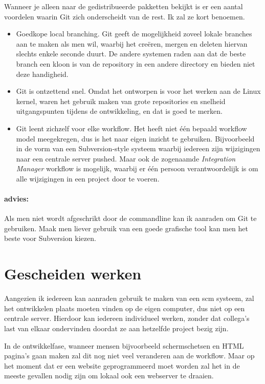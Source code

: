 Wanneer je alleen naar de gedistribueerde pakketten bekijkt is er een aantal voordelen waarin Git zich onderscheidt van de rest. Ik zal ze kort benoemen.

\begin{itemize}
  \item Goedkope local branching. Git geeft de mogelijkheid zoveel lokale branches aan te maken als men wil, waarbij het creëren, mergen en deleten hiervan slechts enkele seconde duurt. De andere systemen raden aan dat de beste branch een kloon is van de repository in een andere directory en bieden niet deze handigheid.
  \item Git is ontzettend snel\cite{whygitisbetterthanx}. Omdat het ontworpen is voor het werken aan de Linux kernel, waren het gebruik maken van grote repositories en snelheid uitgangspunten tijdens de ontwikkeling, en dat is goed te merken.
  \item Git leent zichzelf voor elke workflow. Het heeft niet één bepaald workflow model meegekregen, dus is het naar eigen inzicht te gebruiken. Bijvoorbeeld in de vorm van een Subversion-style systeem waarbij iedereen zijn wijzigingen naar een centrale server pushed. Maar ook de zogenaamde \emph{Integration Manager} workflow is mogelijk, waarbij er één persoon verantwoordelijk is om alle wijzigingen in een project door te voeren.
\end{itemize}

\paragraph{advies:} Als men niet wordt afgeschrikt door de commandline kan ik aanraden om Git te gebruiken. Maak men liever gebruik van een goede grafische tool kan men het beste voor Subversion kiezen.

\section{Gescheiden werken}

Aangezien ik iedereen kan aanraden gebruik te maken van een {\sc scm} systeem, zal het ontwikkelen plaats moeten vinden op de eigen computer, dus niet op een centrale server. Hierdoor kan iedereen individueel werken, zonder dat collega's last van elkaar ondervinden doordat ze aan hetzelfde project bezig zijn.

In de ontwikkelfase, wanneer mensen bijvoorbeeld schermschetsen en HTML pagina's gaan maken zal dit nog niet veel veranderen aan de workflow. Maar op het moment dat er een website geprogrammeerd moet worden zal het in de meeste gevallen nodig zijn om lokaal ook een webserver te draaien. 

